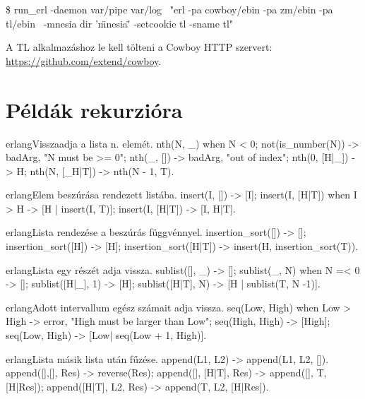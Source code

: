 \documentclass[12pt, a4paper, oneside]{book}
\begin{document}
\begin{code}{}{}
\$ run_erl -daemon var/pipe var/log \
    "erl -pa cowboy/ebin -pa zm/ebin -pa tl/ebin \
     -mnesia dir '\"mnesia\"' -setcookie tl -sname tl"
\end{code}

A TL alkalmazáshoz le kell tölteni a Cowboy HTTP szervert:
\url{https://github.com/extend/cowboy}.


\chapter{Példák rekurzióra}
\begin{code}{erlang}{Visszaadja a lista n. elemét.}
nth(N, _) when N < 0; not(is_number(N)) ->
  {badArg, "N must be >= 0"};
nth(_, []) ->
  {badArg, "out of index"};
nth(0, [H|_]) ->
  H;
nth(N, [_H|T]) ->
  nth(N - 1, T).
\end{code}

\begin{code}{erlang}{Elem beszúrása rendezett listába.}
insert(I, []) ->
  [I];
insert(I, [H|T]) when I > H ->
  [H | insert(I, T)];
insert(I, [H|T]) ->
  [I, H|T].
\end{code}

\begin{code}{erlang}{Lista rendezése a beszúrás függvénnyel.}
insertion_sort([]) ->
  [];
insertion_sort([H]) ->
  [H];
insertion_sort([H|T]) ->
  insert(H, insertion_sort(T)).
\end{code}

\begin{code}{erlang}{Lista egy részét adja vissza.}
sublist([], _) ->
  [];
sublist(_, N) when N =< 0 ->
  [];
sublist([H|_], 1) ->
  [H];
sublist([H|T], N) ->
  [H | sublist(T, N -1)].
\end{code}

\begin{code}{erlang}{Adott intervallum egész számait adja vissza.}
seq(Low, High) when Low > High ->
  {error, "High must be larger than Low"};
seq(High, High) ->
  [High];
seq(Low, High) ->
  [Low| seq(Low + 1, High)].
\end{code}

\begin{code}{erlang}{Lista másik lista után fűzése.}
append(L1, L2) ->
  append(L1, L2, []).
append([],[], Res) -> reverse(Res);
append([], [H|T], Res) ->
  append([], T, [H|Res]);
append([H|T], L2, Res) ->
  append(T, L2, [H|Res]).
\end{code}
\end{document}
